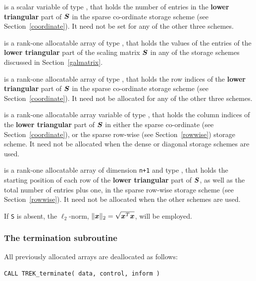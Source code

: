 \documentclass{galahad}
\newcommand{\packagename}{TREK}
\begin{document}
\begin{description}
\begin{description}
 is a scalar variable of type \integer, that
holds the number of entries in the {\bf lower triangular} part of ${\bm{S}}$
in the sparse co-ordinate storage scheme (see Section~\ref{coordinate}).
It need not be set for any of the other three schemes.

 is a rank-one allocatable array of type \realdp, that holds
the values of the entries of the {\bf lower triangular} part
of the scaling matrix ${\bm{S}}$ in any of the
storage schemes discussed in Section~\ref{galmatrix}.

 is a rank-one allocatable array of type \integer,
that holds the row indices of the {\bf lower triangular} part of ${\bm{S}}$
in the sparse co-ordinate storage
scheme (see Section~\ref{coordinate}).
It need not be allocated for any of the other three schemes.

 is a rank-one allocatable array variable of type \integer,
that holds the column indices of the {\bf lower triangular} part of
${\bm{S}}$ in either the sparse co-ordinate
(see Section~\ref{coordinate}), or the sparse row-wise
(see Section~\ref{rowwise}) storage scheme.
It need not be allocated when the dense or diagonal storage schemes are used.

 is a rank-one allocatable array of dimension {\tt n+1} and type
\integer, that holds the starting position of
each row of the {\bf lower triangular} part of ${\bm{S}}$, as well
as the total number of entries plus one, in the sparse row-wise storage
scheme (see Section~\ref{rowwise}). It need not be allocated when the
other schemes are used.

\end{description}
If {\tt S} is absent, the $\ell_2$-norm, $\|{\bm{x}}\|_2 = \sqrt{{\bm{x}}^T {\bm{x}}}$,
will be employed.

\end{description}


\subsubsection{The termination subroutine}
All previously allocated arrays are deallocated as follows:

\vspace*{2mm}
\hskip0.5in
{\tt CALL \packagename\_terminate( data, control, inform )}
\end{document}
